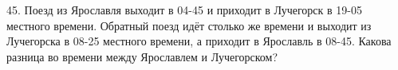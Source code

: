 45. Поезд из Ярославля выходит в 04-45 и приходит в Лучегорск в 19-05 местного времени. Обратный поезд идёт столько же времени и выходит из Лучегорска в 08-25 местного времени, а приходит в Ярославль в 08-45. Какова разница во времени между Ярославлем и Лучегорском?\\
